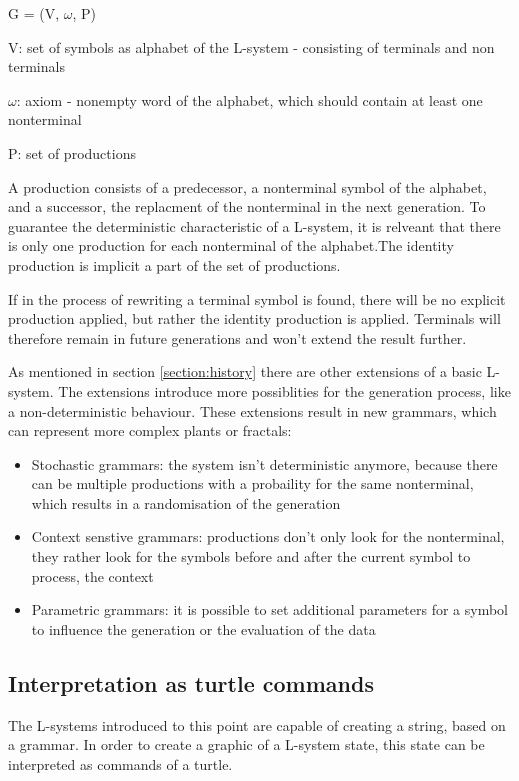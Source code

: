 \documentclass[english]{cpp-hmwk}
\begin{document}
\begin{center}
G = (V, $\omega$, P)
\end{center}

V: set of symbols as alphabet of the L-system - consisting of terminals and non terminals

$\omega$: axiom - nonempty word of the alphabet, which should contain at least one nonterminal

P: set of productions

\medskip
\noindent A production consists of a predecessor, a nonterminal symbol of the alphabet, and a successor, the replacment of the nonterminal in the next generation.
To guarantee the deterministic characteristic of a L-system, it is relveant that there is only one production for each nonterminal of the alphabet.The identity production is implicit a part of the set of productions.\cite[Cf. Chapter 1.2, p.~4f.]{prusinkiewiczp.lindenmayera.2004}

\medskip

If in the process of rewriting a terminal symbol is found, there will be no explicit production applied, but rather the identity production is applied. Terminals will therefore remain in future generations and won't extend the result further.

\medskip

\noindent As mentioned in section \ref{section:history} there are other extensions of a basic L-system. The extensions introduce more possiblities for the generation process, like a non-deterministic behaviour. These extensions result in new grammars, which can represent more complex plants or fractals:

\begin{itemize}
\item Stochastic grammars: the system isn't deterministic anymore, because there can be multiple productions with a probaility for the same nonterminal, which results in a randomisation of the generation
\item Context senstive grammars: productions don't only look for the nonterminal, they rather look for the symbols before and after the current symbol to process, the context
\item Parametric grammars: it is possible to set additional parameters for a symbol to influence the generation or the evaluation of the data
\end{itemize}

\subsection{Interpretation as turtle commands}
\label{section:turtle}
The L-systems introduced to this point are capable of creating a string, based on a grammar. In order to create a graphic of a L-system state, this state can be interpreted as commands of a turtle.
\end{document}
